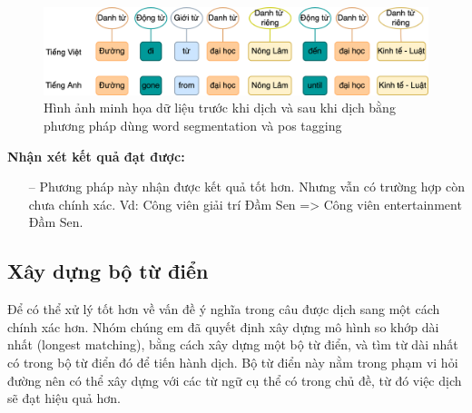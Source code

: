 \begin{figure}[htp]
    \centering
    \includegraphics[width=15cm]{images/trainingdata-wordsegment.png}
    \caption{Hình ảnh minh họa dữ liệu trước khi dịch và sau khi dịch bằng phương pháp dùng word segmentation và pos tagging}
    \label{fig:trainingdata-wordsegment}
\end{figure}

\textbf{Nhận xét kết quả đạt được:}
\begin{itemize}
    \item[--] Phương pháp này nhận được kết quả tốt hơn. Nhưng vẫn có trường hợp còn chưa chính xác. Vd: Công viên giải trí Đầm Sen => Công viên entertainment Đầm Sen.
   
\end{itemize}

\subsection{Xây dựng bộ từ điển}
Để có thể xử lý tốt hơn về vấn đề ý nghĩa trong câu được dịch sang một cách chính xác hơn. Nhóm chúng em đã quyết định xây dựng mô hình so khớp dài nhất (longest matching), bằng cách xây dựng một bộ từ điển, và tìm từ dài nhất có trong bộ từ điển đó để tiến hành dịch. Bộ từ điển này nằm trong phạm vi hỏi đường nên có thể xây dựng với các từ ngữ cụ thể có trong chủ đề, từ đó việc dịch sẽ đạt hiệu quả hơn.

